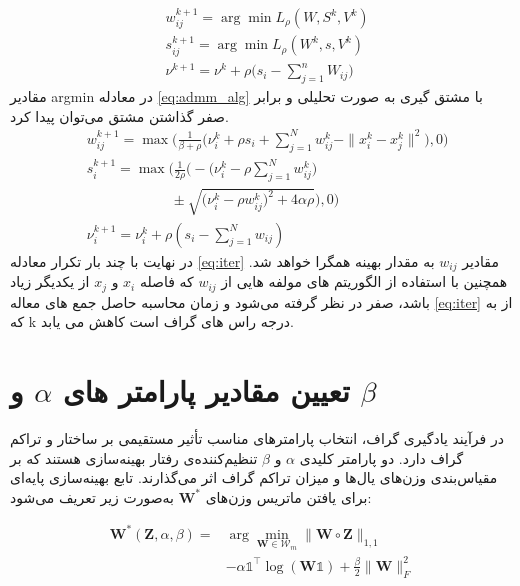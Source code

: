 \documentclass[10pt,twocolumn,a4paper]{article}
\begin{document}
	\begin{equation}\label{eq:admm_alg}
		\begin{aligned}
			&w_{ij}^{k+1} = \arg\min L_{\rho} (W, S^k, V^k)\\
			&s_{ij}^{k+1} = \arg\min L_{\rho} (W^k, s, V^k)\\
			&\nu^{k+1} = \nu^k + \rho \big( s_i - \sum_{j=1}^{n} W_{ij} \big)
		\end{aligned}
	\end{equation}
	مقادیر argmin در معادله \ref{eq:admm_alg} با مشتق گیری به صورت تحلیلی و برابر صفر گذاشتن مشتق می‌توان پیدا کرد.
	\begin{equation}\label{eq:iter}
		\begin{array}{cl}
			&w_{ij}^{k+1} = \max \big( \frac{1}{\beta + \rho} \big( \nu_i^k + \rho s_i + \sum_{j=1}^{N} w_{ij}^k - \|x_i^k - x_j^k\|^2 \big), 0 \big) \\
			&s_i^{k+1} = \max \Big( \frac{1}{2\rho} \big( -\big( \nu_i^k - \rho \sum_{j=1}^{N} w_{ij}^k \big) \\
			&\qquad\qquad\qquad\pm \sqrt{\big( \nu_i^k - \rho w_{ij}^k \big)^2 + 4\alpha \rho} \big), 0 \Big) \\
			&\nu_i^{k+1} = \nu_i^k + \rho \left( s_i - \sum_{j=1}^{N} w_{ij} \right)
		\end{array}
	\end{equation}
	در نهایت با چند بار تکرار معادله \ref{eq:iter} مقادیر $w_{ij}$ به مقدار بهینه همگرا خواهد شد. همچنین با استفاده از الگوریتم های
	مولفه هایی از $w_{ij}$ که فاصله $x_i$ و $x_j$ از یکدیگر زیاد باشد، صفر در نظر گرفته می‌شود و زمان محاسبه حاصل جمع های معاله \ref{eq:iter} از
	به
	که k درجه راس های گراف است کاهش می یابد.
	
	\section{تعیین مقادیر پارامتر های $\alpha$ و $\beta$}
	در فرآیند یادگیری گراف، انتخاب پارامترهای مناسب تأثیر مستقیمی بر ساختار و تراکم گراف دارد. دو پارامتر کلیدی \( \alpha \) و \( \beta \) تنظیم‌کننده‌ی رفتار بهینه‌سازی هستند که بر مقیاس‌بندی وزن‌های یال‌ها و میزان تراکم گراف اثر می‌گذارند. تابع بهینه‌سازی پایه‌ای برای یافتن ماتریس وزن‌های \( \bm{W}^* \) به‌صورت زیر تعریف می‌شود:
	
	\begin{equation}\label{eqn:parames1}
	\begin{array}{cl}
	\bm{W}^*(\bm{Z}, \alpha, \beta) = &\arg \min_{\bm{W} \in \mathcal{W}_m} \|\bm{W} \circ \bm{Z}\|_{1,1} \\
	&- \alpha \mathds{1}^\top \log(\bm{W} \mathds{1}) + \frac{\beta}{2} \|\bm{W}\|_F^2
	\end{array}
	\end{equation}
	
\end{document}
